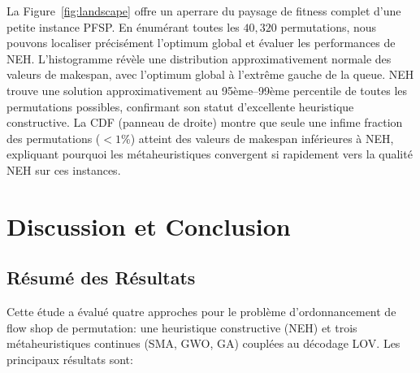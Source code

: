 \documentclass[12pt,a4paper,oneside]{report}
\begin{document}
La Figure~\ref{fig:landscape} offre un aper rare du paysage de fitness complet d'une petite instance PFSP. En \'enum\'erant toutes les $40{,}320$ permutations, nous pouvons localiser pr\'ecis\'ement l'optimum global et \'evaluer les performances de NEH. L'histogramme r\'ev\`ele une distribution approximativement normale des valeurs de makespan, avec l'optimum global \`a l'extr\^eme gauche de la queue. NEH trouve une solution approximativement au 95\`eme--99\`eme percentile de toutes les permutations possibles, confirmant son statut d'excellente heuristique constructive. La CDF (panneau de droite) montre que seule une infime fraction des permutations ($< 1\%$) atteint des valeurs de makespan inf\'erieures \`a NEH, expliquant pourquoi les m\'etaheuristiques convergent si rapidement vers la qualit\'e NEH sur ces instances.

\clearpage

\chapter{Discussion et Conclusion}

\section{R\'esum\'e des R\'esultats}

Cette \'etude a \'evalu\'e quatre approches pour le probl\`eme d'ordonnancement de flow shop de permutation: une heuristique constructive (NEH) et trois m\'etaheuristiques continues (SMA, GWO, GA) coupl\'ees au d\'ecodage LOV. Les principaux r\'esultats sont:
\end{document}
